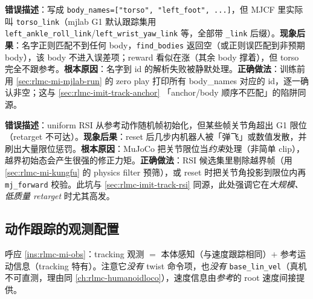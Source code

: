 \begin{pitfall}
\textbf{错误描述}：写成 \verb|body_names=["torso", "left_foot", ...]|，但 MJCF 里实际叫 \verb|torso_link|（mjlab G1 默认跟踪集用 \verb|left_ankle_roll_link|/\verb|left_wrist_yaw_link| 等，全部带 \verb|_link| 后缀）。\textbf{现象后果}：名字正则匹配不到任何 body，\verb|find_bodies| 返回空（或正则误匹配到非预期 body），该 body 不进入误差项；reward 看似在涨（其余 body 撑着），但 torso 完全不跟参考。\textbf{根本原因}：名字到 id 的解析失败被静默处理。\textbf{正确做法}：训练前用 \cref{sec:rlmc-mi-mjlab-run} 的 zero play 打印所有 body\_names 对应的 id，逐一确认非空；这与 \cref{sec:rlmc-imit-track-anchor} 「anchor/body 顺序不匹配」的陷阱同源。
\end{pitfall}

\begin{pitfall}
\textbf{错误描述}：uniform RSI 从参考动作随机帧初始化，但某些帧关节角超出 G1 限位（retarget 不可达）。\textbf{现象后果}：reset 后几步内机器人被「弹飞」或数值发散，并刷出大量限位惩罚。\textbf{根本原因}：MuJoCo 把关节限位当\emph{约束}处理（非简单 clip），越界初始态会产生很强的修正力矩。\textbf{正确做法}：RSI 候选集里剔除越界帧（用 \cref{sec:rlmc-mi-kungfu} 的 physics filter 预筛），或 reset 时把关节角投影到限位内再 \verb|mj_forward| 校验。此坑与 \cref{sec:rlmc-imit-track-rsi} 同源，此处强调它在\emph{大规模、低质量 retarget} 时尤其高发。
\end{pitfall}

\subsection{动作跟踪的观测配置}
\label{sec:rlmc-mi-mjlab-obs}

呼应 \cref{ins:rlmc-mi-obs}：tracking 观测 $=$ 本体感知（与速度跟踪相同）$+$ 参考运动信息（tracking 特有）。注意它\emph{没有} twist 命令项，也\emph{没有} \verb|base_lin_vel|（真机不可直测，理由同 \cref{ch:rlmc-humanoidloco}），速度信息由\emph{参考}的 root 速度间接提供。

